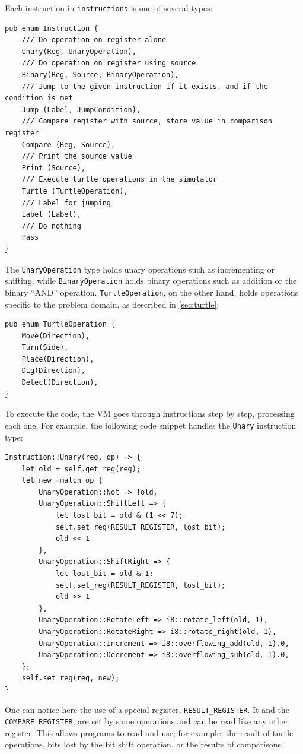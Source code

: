 \documentclass{report}
\begin{document}
Each instruction in \verb|instructions| is one of several types:
\begin{verbatim}
pub enum Instruction {
    /// Do operation on register alone
    Unary(Reg, UnaryOperation),
    /// Do operation on register using source
    Binary(Reg, Source, BinaryOperation),
    /// Jump to the given instruction if it exists, and if the condition is met
    Jump (Label, JumpCondition),
    /// Compare register with source, store value in comparison register
    Compare (Reg, Source),
    /// Print the source value
    Print (Source),
    /// Execute turtle operations in the simulator
    Turtle (TurtleOperation),
    /// Label for jumping
    Label (Label),
    /// Do nothing
    Pass
}
\end{verbatim}

The \verb|UnaryOperation| type holds unary operations such as incrementing or shifting, while \verb|BinaryOperation| holds binary operations such as addition or the binary ``AND'' operation. \verb|TurtleOperation|, on the other hand, holds operations specific to the problem domain, as described in \autoref{sec:turtle}:

\begin{verbatim}
pub enum TurtleOperation {
    Move(Direction),
    Turn(Side),
    Place(Direction),
    Dig(Direction),
    Detect(Direction),
}
\end{verbatim}

To execute the code, the VM goes through instructions step by step, processing each one. For example, the following code snippet handles the \verb|Unary| instruction type:

\begin{verbatim}
Instruction::Unary(reg, op) => {
    let old = self.get_reg(reg);
    let new =match op {
        UnaryOperation::Not => !old,
        UnaryOperation::ShiftLeft => {
            let lost_bit = old & (1 << 7);
            self.set_reg(RESULT_REGISTER, lost_bit);
            old << 1
        },
        UnaryOperation::ShiftRight => {
            let lost_bit = old & 1;
            self.set_reg(RESULT_REGISTER, lost_bit);
            old >> 1
        },
        UnaryOperation::RotateLeft => i8::rotate_left(old, 1),
        UnaryOperation::RotateRight => i8::rotate_right(old, 1),
        UnaryOperation::Increment => i8::overflowing_add(old, 1).0,
        UnaryOperation::Decrement => i8::overflowing_sub(old, 1).0,
    };
    self.set_reg(reg, new);
}
\end{verbatim}

One can notice here the use of a special register, \verb|RESULT_REGISTER|. It and the \verb|COMPARE_REGISTER|, are set by some operations and can be read like any other register. This allows programs to read and use, for example, the result of turtle operations, bits lost by the bit shift operation, or the results of comparisons.
\end{document}
